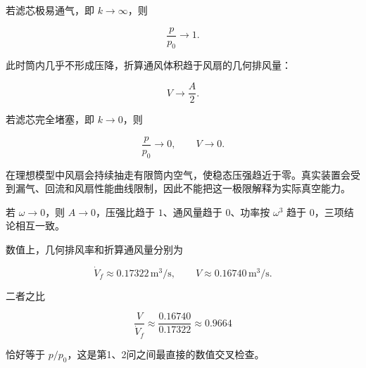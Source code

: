 \documentclass[12pt,a4paper,UTF8]{ctexart}
\begin{document}
若滤芯极易通气，即 \(k\to\infty\)，则

\[
\frac{p}{p_0}\to1.
\]

此时筒内几乎不形成压降，折算通风体积趋于风扇的几何排风量：

\[
V\to\frac{A}{2}.
\]

若滤芯完全堵塞，即 \(k\to0\)，则

\[
\frac{p}{p_0}\to0,
\qquad
V\to0.
\]

在理想模型中风扇会持续抽走有限筒内空气，使稳态压强趋近于零。真实装置会受到漏气、回流和风扇性能曲线限制，因此不能把这一极限解释为实际真空能力。

若 \(\omega\to0\)，则 \(A\to0\)，压强比趋于 \(1\)、通风量趋于
\(0\)、功率按 \(\omega^3\) 趋于 \(0\)，三项结论相互一致。

数值上，几何排风率和折算通风量分别为

\[
\dot V_f\approx0.17322\,\mathrm{m^3/s},
\qquad
V\approx0.16740\,\mathrm{m^3/s}.
\]

二者之比

\[
\frac{V}{\dot V_f}
\approx\frac{0.16740}{0.17322}
\approx0.9664
\]

恰好等于 \(p/p_0\)，这是第1、2问之间最直接的数值交叉检查。
\end{document}
